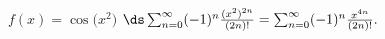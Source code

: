 {$f(x) = \cos \big(x^2\big)$
}
{$\ds \sum_{n=0}^\infty (-1)^n\frac{(x^2)^{2n}}{(2n)!} = \sum_{n=0}^\infty (-1)^n\frac{x^{4n}}{(2n)!}.$
}